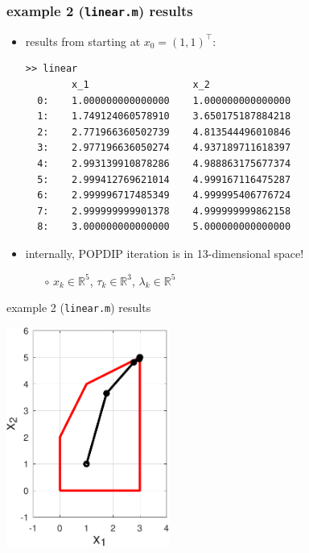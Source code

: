 \documentclass[10pt,hyperref]{beamer}
\newcommand{\RR}{\mathbb{R}}
\begin{document}
\begin{frame}[fragile]
\frametitle{example 2 (\texttt{linear.m}) results}

\begin{itemize}
\item results from starting at $x_0=(1,1)^\top$:
\begin{Verbatim}[fontsize=\scriptsize]
>> linear
        x_1                  x_2
  0:    1.000000000000000    1.000000000000000
  1:    1.749124060578910    3.650175187884218
  2:    2.771966360502739    4.813544496010846
  3:    2.977196636050274    4.937189711618397
  4:    2.993139910878286    4.988863175677374
  5:    2.999412769621014    4.999167116475287
  6:    2.999996717485349    4.999995406776724
  7:    2.999999999901378    4.999999999862158
  8:    3.000000000000000    5.000000000000000
\end{Verbatim}

\bigskip
\item internally, POPDIP iteration is in 13-dimensional space!
    \begin{itemize}
    \item[$\circ$] $x_k \in \RR^5$, \quad $\tau_k \in \RR^3$, \quad $\lambda_k \in \RR^5$
    \end{itemize}
\end{itemize}
\end{frame}


\begin{frame}{example 2 (\texttt{linear.m}) results}

\begin{center}
\includegraphics[width=0.4\textwidth]{figs/linear.pdf}
\end{center}
\end{frame}
\end{document}

